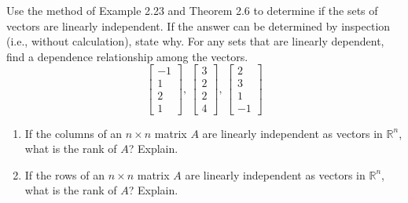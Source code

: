 \documentclass[12pt,letterpaper]{hmcpset}
\begin{document}
\begin{solution}
\vfill
\end{solution}
\newpage

\begin{problem}[2.2.28]

Use the method of Example 2.23 and Theorem 2.6 to determine if the sets of vectors are linearly independent. If the answer can be determined by inspection (i.e., without calculation), state why. For any sets that are linearly dependent, find a dependence relationship among the vectors.$$\begin{bmatrix}
	-1\\
	1\\
	2\\
	1
\end{bmatrix}\text{, }\begin{bmatrix}
	3\\
	2\\
	2\\
	4
\end{bmatrix}\text{, }\begin{bmatrix}
	2\\
	3\\
	1\\
	-1
\end{bmatrix}$$

\end{problem}

\begin{solution}
\vfill
\end{solution}
\newpage

\begin{problem}[2.3.42]

\begin{enumerate}
	\item
		If the columns of an $n \times n$ matrix $A$ are linearly independent as vectors in $\mathbb{R}^n$, what is the rank of $A$? Explain.
	\item
		If the rows of an $n \times n$ matrix $A$ are linearly independent as vectors in $\mathbb{R}^n$, what is the rank of $A$? Explain.
\end{enumerate}

\end{problem}

\begin{solution}
\vfill
\end{solution}
\newpage
\end{document}
